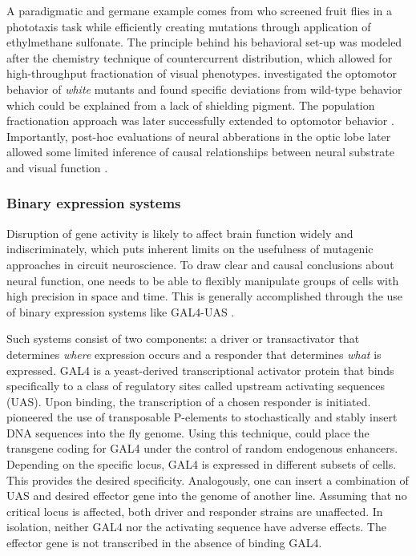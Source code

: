 A paradigmatic and germane example comes from \citet{Benzer:1967aa} who screened fruit flies in a phototaxis task while efficiently creating mutations through application of ethylmethane sulfonate. The principle behind his behavioral set-up was modeled after the chemistry technique of countercurrent distribution, which allowed for high-throughput fractionation of visual phenotypes. \citet{Gotz:1964bj} investigated the optomotor behavior of \textit{white} mutants and found specific deviations from wild-type behavior which could be explained from a lack of shielding pigment. The population fractionation approach was later successfully extended to optomotor behavior \citep{Goetz:1970aa}. Importantly, post-hoc evaluations of neural abberations in the optic lobe later allowed some limited inference of causal relationships between neural substrate and visual function \citep{Pak:1970aa,Heisenberg:1975aa,Heisenberg:1978aa,Fischbach:1981aa}.

\subsubsection{Binary expression systems}
Disruption of gene activity is likely to affect brain function widely and indiscriminately, which puts inherent limits on the usefulness of mutagenic approaches in circuit neuroscience. To draw clear and causal conclusions about neural function, one needs to be able to flexibly manipulate groups of cells with high precision in space and time. This is generally accomplished through the use of binary expression systems like GAL4-UAS \citep{Venken:2011hf}.

Such systems consist of two components: a driver or transactivator that determines \textit{where} expression occurs and a responder that determines \textit{what} is expressed. GAL4 is a yeast-derived transcriptional activator protein that binds specifically to a class of regulatory sites called upstream activating sequences (UAS). Upon binding, the transcription of a chosen responder is initiated. \citet{Rubin:1982aa} pioneered the use of transposable P-elements to stochastically and stably insert DNA sequences into the fly genome. Using this technique, \citet{Brand:1993vw} could place the transgene coding for GAL4 under the control of random endogenous enhancers. Depending on the specific locus, GAL4 is expressed in different subsets of cells. This provides the desired specificity. Analogously, one can insert a combination of UAS and desired effector gene into the genome of another line. Assuming that no critical locus is affected, both driver and responder strains are unaffected. In isolation, neither GAL4 nor the activating sequence have adverse effects. The effector gene is not transcribed in the absence of binding GAL4.


